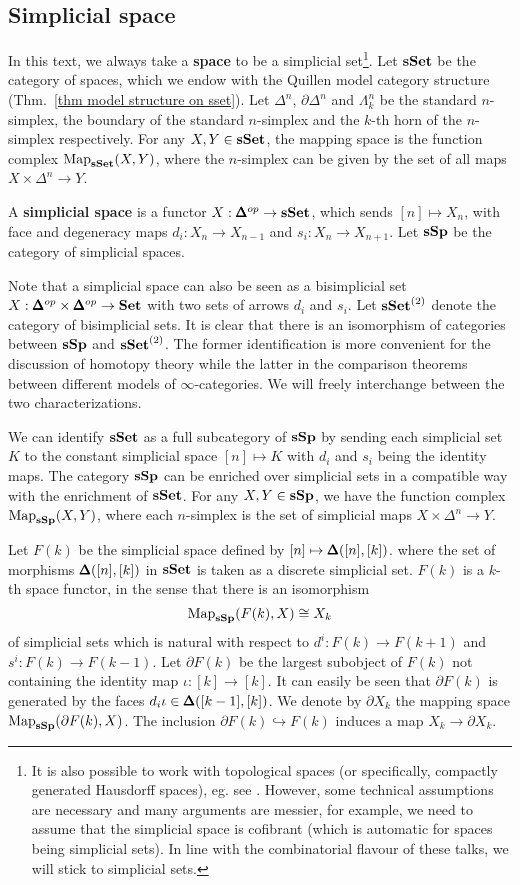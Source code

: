 \begin{refsection}
\subsection{Simplicial space}
In this text, we always take a \textbf{space} to be a simplicial set\footnote{It is also possible to work with topological spaces (or specifically, compactly generated Hausdorff spaces), eg. see \cite{lurietft}. However, some technical assumptions are necessary and many arguments are messier, for example, we need to assume that the simplicial space is cofibrant (which is automatic for spaces being simplicial sets). In line with the combinatorial flavour of these talks, we will stick to simplicial sets.}. Let $\mathbf{sSet}$ be the category of spaces, which we endow with the Quillen model category structure (Thm.~\ref{thm model structure on sset}). Let $\Delta^n$, $\partial\Delta^n$ and $\Lambda^n_k$ be the standard $n$-simplex, the boundary of the standard $n$-simplex and the $k$-th horn of the $n$-simplex respectively. For any $X,Y\in\mathbf{sSet}$, the mapping space is the function complex $\operatorname{\mathrm{Map}}_{\mathbf{sSet}}(X,Y)$, where the $n$-simplex can be given by the set of all maps $X\times\Delta^n\to Y$.

A \textbf{simplicial space} is a functor $X:\pmb{\Delta}^{op}\to\mathbf{sSet}$, which sends $[n]\mapsto X_n$, with face and degeneracy maps $d_i:X_n\to X_{n-1}$ and $s_i:X_n\to X_{n+1}$. Let $\mathbf{sSp}$ be the category of simplicial spaces.

Note that a simplicial space can also be seen as a bisimplicial set $X:\pmb{\Delta}^{op}\times\pmb{\Delta}^{op}\to \mathbf{Set}$ with two sets of arrows $d_i$ and $s_i$. Let $\mathbf{sSet}^{(2)}$ denote the category of bisimplicial sets. It is clear that there is an isomorphism of categories between $\mathbf{sSp}$ and $\mathbf{sSet}^{(2)}$. The former identification is more convenient for the discussion of homotopy theory while the latter in the comparison theorems between different models of $\infty$-categories. We will freely interchange between the two characterizations.

We can identify $\mathbf{sSet}$ as a full subcategory of $\mathbf{sSp}$ by sending each simplicial set $K$ to the constant simplicial space $[n]\mapsto K$ with $d_i$ and $s_i$ being the identity maps. The category $\mathbf{sSp}$ can be enriched over simplicial sets in a compatible way with the enrichment of $\mathbf{sSet}$. For any $X,Y\in \mathbf{sSp}$, we have the function complex $\operatorname{\mathrm{Map}}_{\mathbf{sSp}}(X,Y)$, where each $n$-simplex is the set of simplicial maps $X\times\Delta^n\to Y$.

Let $F(k)$ be the simplicial space defined by $[n]\mapsto \pmb{\Delta}([n],[k])$. where the set of morphisms $\pmb{\Delta}([n],[k])$ in $\mathbf{sSet}$ is taken as a discrete simplicial set. $F(k)$ is a $k$-th space functor, in the sense that there is an isomorphism
$$\operatorname{\mathrm{Map}}_{\mathbf{sSp}}(F(k),X)\cong X_k$$
of simplicial sets which is natural with respect to $d^i:F(k)\to F(k+1)$ and $s^i:F(k)\to F(k-1)$.
Let $\partial F(k)$ be the largest subobject of $F(k)$ not containing the identity map $\iota:[k]\to[k]$. It can easily be seen that $\partial F(k)$ is generated by the faces $d_i\iota\in\pmb{\Delta}([k-1],[k])$. We denote by $\partial X_k$ the mapping space $\operatorname{\mathrm{Map}}_{\mathbf{sSp}}(\partial F(k),X)$. The inclusion $\partial F(k)\hookrightarrow F(k)$ induces a map $X_k\to\partial X_k$.


\end{refsection}
